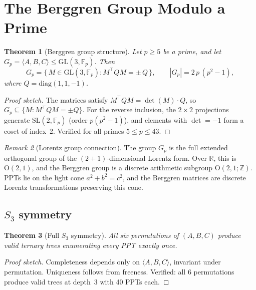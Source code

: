\documentclass[12pt]{amsart}
\newtheorem{theorem}{Theorem}[section]
\theoremstyle{definition}
\theoremstyle{remark}
\newtheorem{remark}[theorem]{Remark}
\begin{document}

\section{The Berggren Group Modulo a Prime}\label{sec:group}

\begin{theorem}[Berggren group structure]\label{thm:group-structure}
Let $p \ge 5$ be a prime, and let $G_p = \langle A,B,C\rangle \le \mathrm{GL}(3,\mathbb{F}_p)$.
Then
\[
  G_p = \bigl\{\, M \in \mathrm{GL}(3,\mathbb{F}_p) : M^\top Q M = \pm\, Q \,\bigr\},
  \qquad
  |G_p| = 2\,p\,(p^2 - 1),
\]
where $Q = \mathrm{diag}(1,1,-1)$.
\end{theorem}

\begin{proof}[Proof sketch]
The matrices satisfy $M^\top Q M = \det(M) \cdot Q$, so
$G_p \subseteq \{M : M^\top Q M = \pm Q\}$. For the reverse inclusion, the
$2 \times 2$ projections generate $\mathrm{SL}(2,\mathbb{F}_p)$ (order
$p(p^2-1)$), and elements with $\det = -1$ form a coset of index~2.
Verified for all primes $5 \le p \le 43$.
\end{proof}

\begin{remark}[Lorentz group connection]
The group $G_p$ is the full extended orthogonal group of the $(2{+}1)$-dimensional
Lorentz form. Over $\mathbb{R}$, this is $\mathrm{O}(2,1)$, and the Berggren
group is a discrete arithmetic subgroup $\mathrm{O}(2,1;\mathbb{Z})$. PPTs
lie on the light cone $a^2 + b^2 = c^2$, and the Berggren matrices are
discrete Lorentz transformations preserving this cone.
\end{remark}

\subsection{$S_3$ symmetry}

\begin{theorem}[Full $S_3$ symmetry]\label{thm:S3}
All six permutations of $(A,B,C)$ produce valid ternary trees enumerating
every PPT exactly once.
\end{theorem}

\begin{proof}[Proof sketch]
Completeness depends only on $\langle A,B,C \rangle$, invariant under
permutation. Uniqueness follows from freeness. Verified: all 6 permutations
produce valid trees at depth~3 with 40 PPTs each.
\end{proof}
\end{document}
